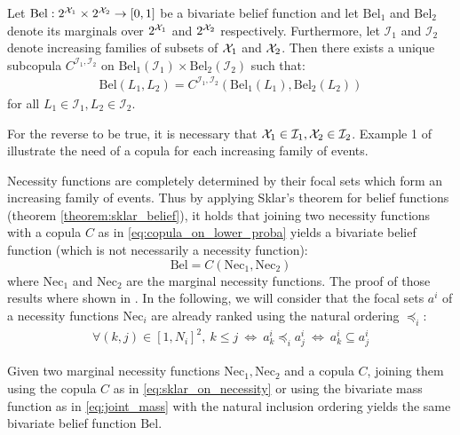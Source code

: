 \begin{theorem}\label{theorem:sklar_belief}
    Let $\mathrm{Bel}:2^{{\mathcal{X}}_1}\times2^{{\mathcal{X}}_2}\rightarrow[0,1]$ be a bivariate belief function and let $\mathrm{Bel}_1$ and $\mathrm{Bel}_2$ denote its marginals over $2^{{\mathcal{X}}_1}$ and $2^{{\mathcal{X}}_2}$ respectively. Furthermore, let $\mathcal{I}_1$ and $\mathcal{I}_2$ denote increasing families of subsets of ${\mathcal{X}}_1$ and ${\mathcal{X}}_2$. Then there exists a unique subcopula $C^{\mathcal{I}_1,\mathcal{I}_2}$ on  $\mathrm{Bel}_1(\mathcal{I}_1)\times \mathrm{Bel}_2(\mathcal{I}_2)$ such that:
    \begin{eqnarray}
        \mathrm{Bel}(L_1, L_2) = C^{\mathcal{I}_1,\mathcal{I}_2}(\mathrm{Bel}_1(L_1), \mathrm{Bel}_2(L_2))
    \end{eqnarray}
    for all $L_1\in\mathcal{I}_1,L_2\in\mathcal{I}_2$.
\end{theorem}
For the reverse to be true, it is necessary that ${\mathcal{X}}_1\in\mathcal{I}_1, {\mathcal{X}}_2\in\mathcal{I}_2$. Example 1 of \cite{schmelzer_joint_2015} illustrate the need of a copula for each increasing family of events.

Necessity functions are completely determined by their focal sets which form an increasing family of events. Thus by applying Sklar's theorem for belief functions (theorem \ref{theorem:sklar_belief}), it holds that joining two necessity functions with a copula $C$ as in \eqref{eq:copula_on_lower_proba} yields a bivariate belief function (which is not necessarily a necessity function):
\begin{equation}
    \mathrm{Bel} = C(\mathrm{Nec}_1, \mathrm{Nec}_2)\label{eq:sklar_on_necessity}
\end{equation}
where $\mathrm{Nec}_1$ and $\mathrm{Nec}_2$ are the marginal necessity functions. The proof of those results where shown in \cite{schmelzer_joint_2015,schmelzer_sklars_2015}. In the following, we will consider that the focal sets $a^i$ of a necessity functions $\mathrm{Nec}_i$ are already ranked using the natural ordering $\preceq_i$:
\begin{eqnarray}
    \forall (k,j)\in[1, N_i]^2,~k\leqslant j ~\Leftrightarrow ~ a^i_k \preceq_i a^i_j ~\Leftrightarrow ~ a^i_k\subseteq a^i_j
\end{eqnarray}

\begin{proposition}\label{prop:sklar_necessity}
    Given two marginal necessity functions $\mathrm{Nec}_1, \mathrm{Nec}_2$ and a copula $C$, joining them using the copula $C$ as in \eqref{eq:sklar_on_necessity} or using the bivariate mass function as in \eqref{eq:joint_mass} with the natural inclusion ordering yields the same bivariate belief function $\mathrm{Bel}$.
\end{proposition}

